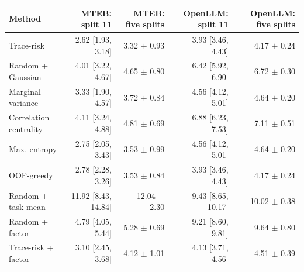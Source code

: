\begin{tabular}{lrrrr}
\toprule
Method & MTEB: split 11 & MTEB: five splits & OpenLLM: split 11 & OpenLLM: five splits \\
\midrule
Trace-risk & 2.62 [1.93, 3.18] & 3.32 $\pm$ 0.93 & 3.93 [3.46, 4.43] & 4.17 $\pm$ 0.24 \\
Random + Gaussian & 4.01 [3.22, 4.67] & 4.65 $\pm$ 0.80 & 6.42 [5.92, 6.90] & 6.72 $\pm$ 0.30 \\
Marginal variance & 3.33 [1.90, 4.57] & 3.72 $\pm$ 0.84 & 4.56 [4.12, 5.01] & 4.64 $\pm$ 0.20 \\
Correlation centrality & 4.11 [3.24, 4.88] & 4.81 $\pm$ 0.69 & 6.88 [6.23, 7.53] & 7.11 $\pm$ 0.51 \\
Max. entropy & 2.75 [2.05, 3.43] & 3.53 $\pm$ 0.99 & 4.56 [4.12, 5.01] & 4.64 $\pm$ 0.20 \\
OOF-greedy & 2.78 [2.28, 3.26] & 3.53 $\pm$ 0.84 & 3.93 [3.46, 4.43] & 4.17 $\pm$ 0.24 \\
Random + task mean & 11.92 [8.43, 14.84] & 12.04 $\pm$ 2.30 & 9.43 [8.65, 10.17] & 10.02 $\pm$ 0.38 \\
Random + factor & 4.79 [4.05, 5.44] & 5.28 $\pm$ 0.69 & 9.21 [8.60, 9.81] & 9.64 $\pm$ 0.80 \\
Trace-risk + factor & 3.10 [2.45, 3.68] & 4.12 $\pm$ 1.01 & 4.13 [3.71, 4.56] & 4.51 $\pm$ 0.39 \\
\bottomrule
\end{tabular}
